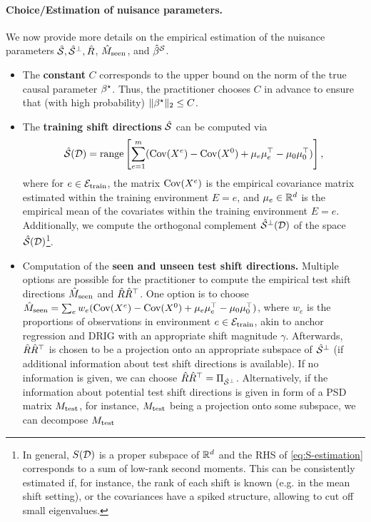 \paragraph{Choice/Estimation of nuisance parameters.} We now provide more details on the empirical estimation of the nuisance parameters $\hat{\mathcal{S}}, \hat{\mathcal{S}}^\perp, \hat{R}$, $\hat{M}_{\mathrm{seen}}$, and $\hat{\beta}^{\mathcal{S}}$. 
\begin{itemize}
    \item The \textbf{constant} $C$ corresponds to the upper bound on the norm of the true causal parameter $\beta^{\star}$. Thus, the practitioner chooses $C$ in advance to ensure that (with high probability) $\| \beta^{\star} \|_2 \leq C$. 
    \item The \textbf{training shift directions} $\hat{\mathcal{S}}$ can be computed via 
     \begin{align}\label{eq:S-estimation}
        \hat{\mathcal{S}}(\mathcal{D}) = \mathrm{range} \left[\sum_{e = 1}^m ( \mathrm{Cov}(X^e)- \mathrm{Cov}(X^0) + \mu_e \mu_e^\top - \mu_0 \mu_0^\top)\right],
    \end{align}
where for $e \in \mathcal{E}_{\mathrm{train}}$, the matrix $\mathrm{Cov}(X^e)$ is the empirical covariance matrix estimated within the training environment $E = e$, and $\mu_e \in \mathbb{R}^d$ is the empirical mean of the covariates within the training environment $E = e$. Additionally, we compute the orthogonal complement $\hat{\mathcal{S}}^\perp(\mathcal{D})$ of the space $\hat{\mathcal{S}}(\mathcal{D})$\footnote{In general, $S(\mathcal{D})$ is a proper subspace of $\mathbb{R}^d$ and the RHS of \eqref{eq:S-estimation} corresponds to a sum of low-rank second moments. This can be consistently estimated if, for instance, the rank of each shift is known (e.g. in the mean shift setting), or the covariances have a spiked structure, allowing to cut off small eigenvalues.}. 
\item  Computation of the \textbf{seen and unseen test shift directions.} Multiple options are possible for the practitioner to compute the empirical test shift directions $\hat{M}_{\mathrm{seen}}$ and $\hat{R} \hat{R}^\top$. One option is to choose $\hat{M}_{\mathrm{seen}} = \sum_{e} w_e ( \mathrm{Cov}(X^e)- \mathrm{Cov}(X^0) + \mu_e \mu_e^\top - \mu_0 \mu_0^\top)$, where $w_e$ is the proportions of observations in environment $e \in \mathcal{E}_{\mathrm{train}}$, akin to anchor regression \cite{rothenhausler2021anchor} and DRIG \cite{shen2023causalityoriented} with an appropriate shift magnitude $\gamma$. Afterwards, $\hat{R} \hat{R}^\top$ is chosen to be a projection onto an appropriate subspace of $\hat{\mathcal{S}}^\perp$ (if additional information about test shift directions is available). If no information is given, we can choose $\hat{R} \hat{R}^\top = \Pi_{\hat{\mathcal{S}}^\perp}$. Alternatively, if the information about potential test shift directions is given in form of a PSD matrix $M_{\mathrm{test}}$, for instance, $M_{\mathrm{test}}$ being a projection onto some subspace, we can decompose $M_{\mathrm{test}}$ 

\end{itemize}
